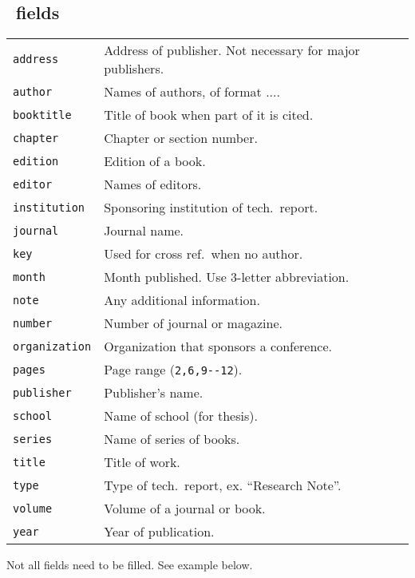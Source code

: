\subsection{\BibTeX\ fields}
\begin{tabular}{@{}p{\the\MyLen}@{}p{\linewidth-\the\MyLen}@{}}
\verb!address!         &  Address of publisher.  Not necessary for major
                                publishers.  \\
\verb!author!           &  Names of authors, of format .... \\
\verb!booktitle!        &  Title of book when part of it is cited. \\
\verb!chapter!          &  Chapter or section number. \\
\verb!edition!          &  Edition of a book. \\
\verb!editor!           &  Names of editors. \\
\verb!institution!      &  Sponsoring institution of tech.\ report. \\
\verb!journal!          &  Journal name. \\
\verb!key!              &  Used for cross ref.\ when no author. \\
\verb!month!            &  Month published. Use 3-letter abbreviation. \\
\verb!note!             &  Any additional information. \\
\verb!number!           &  Number of journal or magazine. \\
\verb!organization!     &  Organization that sponsors a conference. \\
\verb!pages!            &  Page range (\verb!2,6,9--12!). \\
\verb!publisher!        &  Publisher's name. \\
\verb!school!           &  Name of school (for thesis). \\
\verb!series!           &  Name of series of books. \\
\verb!title!            &  Title of work. \\
\verb!type!             &  Type of tech.\ report, ex. ``Research Note''. \\
\verb!volume!           &  Volume of a journal or book. \\
\verb!year!             &  Year of publication. \\
\end{tabular}
Not all fields need to be filled.  See example below.

